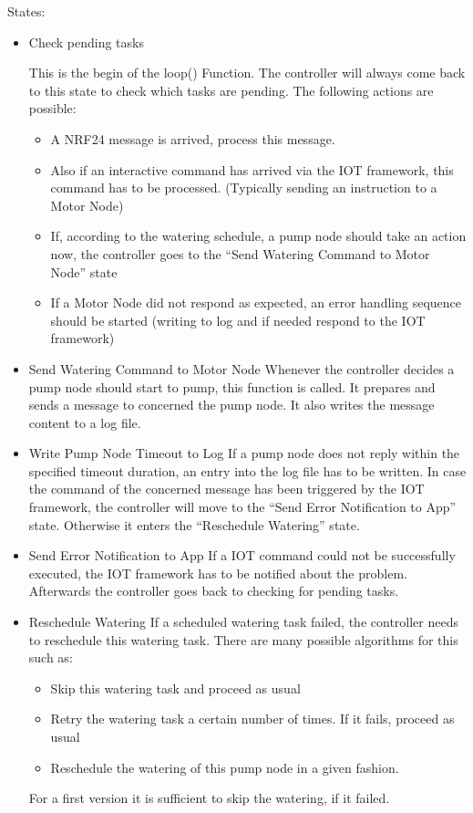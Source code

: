 States:
\begin{itemize}
	\item Check pending tasks

		This is the begin of the loop() Function. The controller will always come back to this state to check which tasks are pending. The following actions are possible:

		\begin{itemize}
			\item A NRF24 message is arrived, process this message.
			\item Also if an interactive command has arrived via the IOT framework, this command has to be processed. (Typically sending an instruction to a Motor Node)
			\item If, according to the watering schedule, a pump node should take an action now, the controller goes to the ``Send Watering Command to Motor Node'' state
			\item If a Motor Node did not respond as expected, an error handling sequence should be started (writing to log and if needed respond to the IOT framework)
		\end{itemize}

	\item Send Watering Command to Motor Node
		Whenever the controller decides a pump node should start to pump, this function is called. 			It prepares and sends a message to concerned the pump node. It also writes the message content to a log file.
	\item Write Pump Node Timeout to Log
		If a pump node does not reply within the specified timeout duration, an entry into the log file has to be written. In case the command of the concerned message has been triggered by the IOT framework, the controller will move to the ``Send Error Notification to App'' state. Otherwise it enters the ``Reschedule Watering'' state.
	\item Send Error Notification to App
			If a IOT command could not be successfully executed, the IOT framework has to be notified about the problem. Afterwards the controller goes back to checking for pending tasks.
	\item Reschedule Watering
		If a scheduled watering task failed, the controller needs to reschedule this watering task.
		There are many possible algorithms for this such as:
		\begin{itemize}
			\item Skip this watering task and proceed as usual
			\item Retry the watering task a certain number of times. If it fails, proceed as usual
			\item Reschedule the watering of this pump node in a given fashion.
		\end{itemize}
		For a first version it is sufficient to skip the watering, if it failed.
		

\end{itemize}
